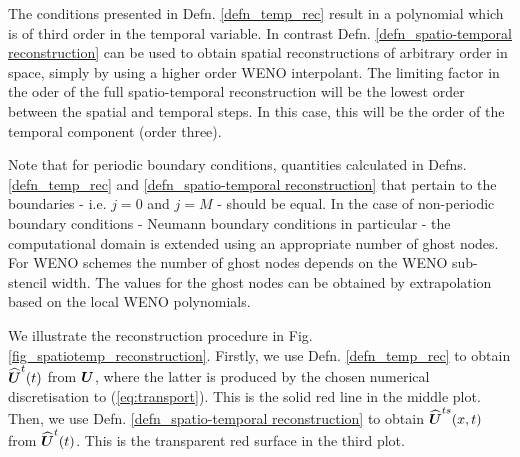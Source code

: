 \documentclass[final]{amsart}
\renewcommand{\vect}[1]{\geovec{#1}}
\numberwithin{equation}{section}
\begin{document}
\begin{Rem}
	The conditions presented in Defn. \ref{defn_temp_rec} result in a polynomial which is of third order in the temporal variable.   In contrast Defn. \ref{defn_spatio-temporal reconstruction} can be used to obtain spatial reconstructions of arbitrary order in space, simply by using a higher order WENO interpolant.  The limiting factor in the oder of the full spatio-temporal reconstruction will be the lowest order between the spatial and temporal steps.  In this case, this will be the order of the temporal component (order three). 
\end{Rem}
\begin{Rem}
Note that for periodic boundary conditions, quantities calculated in Defns. \ref{defn_temp_rec} and \ref{defn_spatio-temporal reconstruction} that pertain to the boundaries - i.e. $j=0$ and $j=M$ - should be equal.  In the case of non-periodic boundary conditions - Neumann boundary conditions in particular - the computational domain is extended using an appropriate number of ghost nodes.  For WENO schemes the number of ghost nodes depends on the WENO sub-stencil width.  The values for the ghost nodes can be obtained by extrapolation based on the local WENO polynomials.
\end{Rem}
 
We illustrate the reconstruction procedure in Fig. \ref{fig_spatiotemp_reconstruction}.  Firstly, we use Defn. \ref{defn_temp_rec} to obtain $\widehat{\vect {U}}^t\qp{t}$ from  $\vect{U}$, where the latter is produced by  the chosen numerical discretisation to (\ref{eq:transport}).  This is the solid red line in the middle plot.  Then, we use Defn. \ref{defn_spatio-temporal reconstruction} to obtain $\widehat{\vect {U}}^{ts}\qp{x,t}$ from $\widehat{\vect {U}}^{t}\qp{t}$.  This is the transparent red surface in the third plot. 
\end{document}
